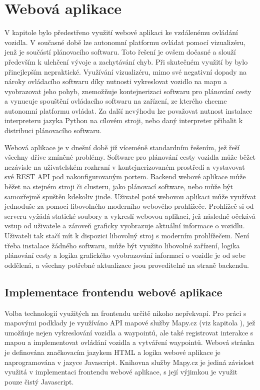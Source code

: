 \documentclass[czech, bachelor]{diploma}
\begin{document}

\chapter{Webová aplikace} \label{web-app}

V kapitole  bylo předestřeno využití webové aplikaci ke vzdálenému ovládání vozidla. V současné době 
lze autonomní platformu ovládat pomocí vizualizéru, jenž je součástí plánovacího softwaru. Toto řešení je ovšem dočasné a slouží
především k ulehčení vývoje a zachytávání chyb. Při skutečném využití by bylo přinejlepším nepraktické. Využívání vizualizéru,
mimo své negativní dopady na nároky ovládacího softwaru díky nutnosti vykreslovat vozidlo na mapu a vyobrazovat jeho pohyb, 
znemožňuje kontejnerizaci softwaru pro plánování cesty a vynucuje spouštění ovládacího softwaru na zařízení, ze kterého chceme 
autonomní platformu ovládat. Za další nevýhodu lze považovat nutnost instalace interpreteru jazyka Python na cílovém stroji, nebo
daný interpreter přibalit k distribuci plánovacího softwaru.

Webová aplikace je v dnešní době již víceméně standardním řešením, jež řeší všechny dříve zmíněné problémy. Software pro plánování
cesty vozidla může běžet nezávisle na uživatelském rozhraní v kontejnerizovaném prostředí a vystavovat své REST API 
pod nakonfigurovaným portem. Backend webové aplikace může běžet na stejném stroji či clusteru, jako plánovací software, nebo může
být samozřejmě spuštěn kdekoliv jinde. Uživatel poté webovou aplikaci může využívat jednoduše za pomoci libovolného moderního 
webového prohlížeče. Prohlížeč si od serveru vyžádá statické soubory a vykreslí webovou aplikaci, jež následně očekává vstup
od uživatele a zároveň graficky vyobrazuje aktuální informace o vozidlu. Uživateli tak stačí mít k dispozici libovolný stroj 
s moderním prohlížečem. Není třeba instalace žádného softwaru, může být využito libovolné zařízení, logika plánování cesty 
a logika grafického vyobrazování informací o vozidle je od sebe oddělená, a všechny potřebné aktualizace jsou proveditelné
na straně backendu.

\section{Implementace frontendu webové aplikace}

Volba technologií využitých na frontendu určitě nikoho nepřekvapí. Pro práci s mapovými podklady je využíváno API mapové služby 
Mapy.cz (viz kapitola ), jež umožňuje nejen vykreslování vozidla a waypointů, ale také registrovat interakce
s mapou a implementovat ovládání vozidla a vytváření waypointů. Webová stránka je definována značkovacím jazykem HTML a logika
webové aplikace je naprogramována v jazyce Javascript. Knihovna služby Mapy.cz je jediná závislost využitá v implementaci
frontendu webové aplikace, s její výjimkou je využit pouze čistý Javascript.
\end{document}
